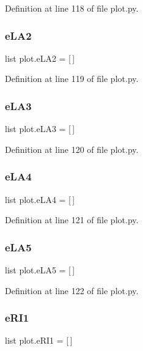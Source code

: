 Definition at line 118 of file plot.\+py.

\mbox{\label{namespaceplot_abd0cc9b2ff5d69aea18c31787b195dd9}} 
\subsubsection{e\+L\+A2}
{\footnotesize\ttfamily list plot.\+e\+L\+A2 = [$\,$]}



Definition at line 119 of file plot.\+py.

\mbox{\label{namespaceplot_a382cf1582f500cb9c94135fd845bae7d}} 
\subsubsection{e\+L\+A3}
{\footnotesize\ttfamily list plot.\+e\+L\+A3 = [$\,$]}



Definition at line 120 of file plot.\+py.

\mbox{\label{namespaceplot_ae992da7b8f7ab158733f82276c6b5148}} 
\subsubsection{e\+L\+A4}
{\footnotesize\ttfamily list plot.\+e\+L\+A4 = [$\,$]}



Definition at line 121 of file plot.\+py.

\mbox{\label{namespaceplot_ae546374802e6933338276b8b8d3a2b4b}} 
\subsubsection{e\+L\+A5}
{\footnotesize\ttfamily list plot.\+e\+L\+A5 = [$\,$]}



Definition at line 122 of file plot.\+py.

\mbox{\label{namespaceplot_aae540e9df8e89cf51fd870af7b17d745}} 
\subsubsection{e\+R\+I1}
{\footnotesize\ttfamily list plot.\+e\+R\+I1 = [$\,$]}



